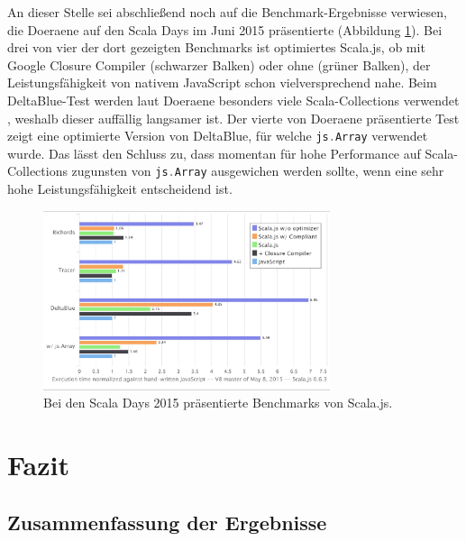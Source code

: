 \documentclass[a4paper, 12pt, hidelinks, listof=totoc, listoftables=totoc, bibliography=totoc]{scrreprt}
\newcommand{\code}[1]{\lstinline[language=Scala, style=inline]|#1|}
\begin{document}
An dieser Stelle sei abschließend noch auf die Benchmark-Ergebnisse verwiesen, die Doeraene auf den Scala Days im Juni 2015 präsentierte (Abbildung \ref{fig:doeraene-benchmarks}). Bei drei von vier der dort gezeigten Benchmarks ist optimiertes Scala.js, ob mit Google Closure Compiler (schwarzer Balken) oder ohne (grüner Balken), der Leistungsfähigkeit von nativem \mbox{JavaScript} schon vielversprechend nahe. Beim DeltaBlue-Test werden laut Doeraene besonders viele Scala-Collections verwendet \cite[Folie 52, Min. 40]{doeraene2015.SSP}, weshalb dieser auffällig langsamer ist. Der vierte von Doeraene präsentierte Test zeigt eine optimierte Version von DeltaBlue, für welche \code{js.Array} verwendet wurde. Das lässt den Schluss zu, dass momentan für hohe Performance auf Scala-Collections zugunsten von \code{js.Array} ausgewichen werden sollte, wenn eine sehr hohe Leistungsfähigkeit entscheidend ist.

\begin{figure}[!h]
    \centering
    \includegraphics[width=0.75\textwidth]{Doeraene2015-Scalajs-p52}
    \caption[Bei den Scala Days 2015 präsentierte Benchmarks von Scala.js.]{Bei den Scala Days 2015 präsentierte Benchmarks von Scala.js. \cite[Folie 52]{doeraene2015.SSP}}
    \label{fig:doeraene-benchmarks}
\end{figure}





\chapter{Fazit}\label{chap:conclusion}

\section{Zusammenfassung der Ergebnisse}
\end{document}

